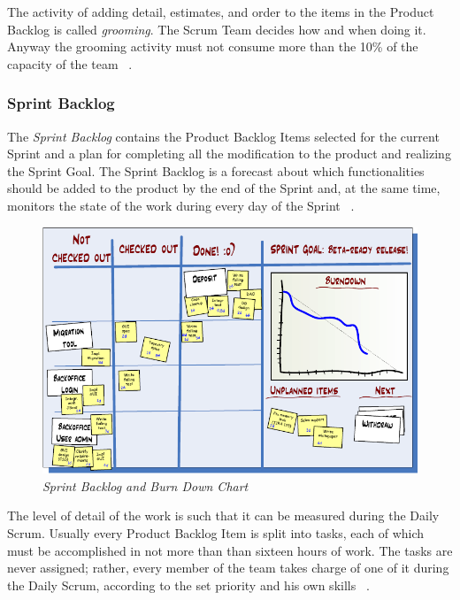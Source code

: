			The activity of adding detail, estimates, and order to the items in the Product Backlog is called \emph{grooming}. The Scrum Team decides how and when doing it. Anyway the grooming activity must not consume more than the 10\% of the capacity of the team ~\cite{scrumEnglishGuide}. 
		

			\subsubsection{Sprint Backlog}\label{ref_scrum_sprint_backlog}
			The \emph{Sprint Backlog} contains the Product Backlog Items selected for the current Sprint and a plan for completing all the modification to the product and realizing the Sprint Goal. 
			The Sprint Backlog is a forecast about which functionalities should be added to the product by the end of the Sprint and, at the same time, monitors the state of the work during every day of the Sprint ~\cite{scrumEnglishGuide}.
			
			\begin{figure}[h]
			  \begin{center} 
			    \includegraphics[scale=0.65]{images/ch_04/task_board_and_chart.png}
			  \end{center} 
			  \caption{\textit{Sprint Backlog and Burn Down Chart}}  
			  \label{fig:SprintBacklog}
		  	\end{figure}

			The level of detail of the work is such that it can be measured during the Daily Scrum. Usually every Product Backlog Item is split into tasks, each of which must be accomplished in not more than than sixteen hours of work. The tasks are never assigned; rather, every member of the team takes charge of one of it during the Daily Scrum, according to the set priority and his own skills ~\cite{scrumEnglishGuide}. 
	
